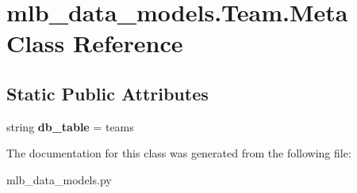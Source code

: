 \hypertarget{classmlb__data__models_1_1Team_1_1Meta}{}\section{mlb\+\_\+data\+\_\+models.\+Team.\+Meta Class Reference}
\label{classmlb__data__models_1_1Team_1_1Meta}
\subsection*{Static Public Attributes}
\begin{DoxyCompactItemize}
\item 
string {\bfseries db\+\_\+table} = \textquotesingle{}teams\textquotesingle{}\hypertarget{classmlb__data__models_1_1Team_1_1Meta_a2b1c9cb88ee477389472d94f1971ddb4}{}\label{classmlb__data__models_1_1Team_1_1Meta_a2b1c9cb88ee477389472d94f1971ddb4}

\end{DoxyCompactItemize}


The documentation for this class was generated from the following file\+:\begin{DoxyCompactItemize}
\item 
mlb\+\_\+data\+\_\+models.\+py\end{DoxyCompactItemize}
